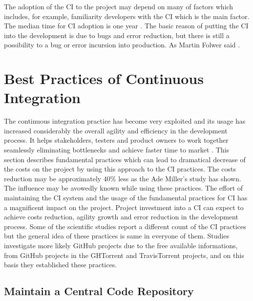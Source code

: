 The adoption of the CI to the project may depend on many of factors which includes, for example, familiarity developers with the CI which is the main factor. The median time for CI adoption is one year \cite{COPE}. The basic reason of putting the CI into the development is due to bugs and error reduction, but there is still a possibility to a bug or error incursion into production. As Martin Folwer said  \cite{MartinFowler}.

\section{Best Practices of Continuous Integration}

The continuous integration practice has become very exploited and its usage has increased considerably the overall agility and efficiency in the development process. It helps stakeholders, testers and product owners to work together seamlessly eliminating bottlenecks and achieve faster time to market \cite{CI-BP1}. This section describes fundamental practices which can lead to dramatical decrease of the costs on the project by using this approach to the CI practices. The costs reduction may be approximately 40\% less as the Ade Miller's study \cite{100DaysOfCI} has shown. The influence may be avowedly known while using these practices. The effort of maintaining the CI system and the usage of the fundamental practices for CI has a magnificent impact on the project. Project investment into a CI can expect to achieve costs reduction, agility growth and error reduction in the development process. Some of the scientific studies report a different count of the CI practices but the general idea of these practices is same in everyone of them. Studies investigate more likely GitHub projects due to the free available informations, from GitHub projects in the GHTorrent and TravisTorrent projects, and on this basis they established these practices.

\subsection{Maintain a Central Code Repository}

